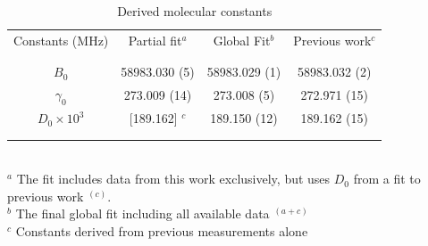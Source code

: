 \begin{table}[!htb]
    \centering
    
    \caption{Derived molecular constants}
    \begin{tabular}{cccc}
    
        Constants (MHz) & Partial fit$^a$ & Global Fit$^b$ & Previous work$^c$\\\\
        
        \hline \hline \\
        $B_0$                   & 58983.030 (5)     & 58983.029 (1)   &  58983.032 (2) \\
        $\gamma_0$              & 273.009  (14)     &  273.008  (5)   &  272.971  (15) \\
        $D_0 \times 10^3$       & [189.162] $^c$    &  189.150  (12)  &  189.162  (15) \\
        
        \\ \hline \\
    \end{tabular}\\
    $^a$ The fit includes data from this work exclusively, but uses $D_0$ from a fit to previous work $^{(c)}$.\\
    $^b$ The final global fit including all available data $^{(a+c)}$\\
    $^c$ Constants derived from previous measurements alone \cite{Dixon1975, Sastry1981, heuvel_dymanus_1982, Spezzano2013}\\
    
    \label{tab:constants}
\end{table}

